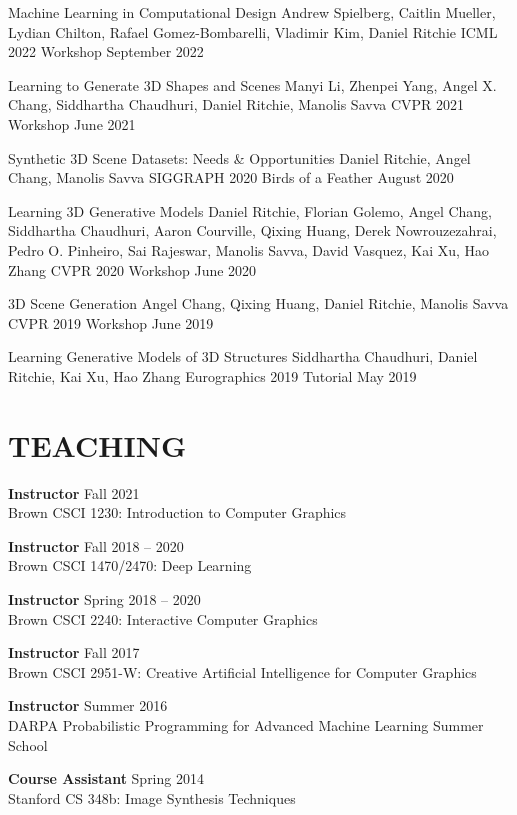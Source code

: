 \documentclass[line,margin]{res}
\begin{document}
\begin{resume}
\workshop
{Machine Learning in Computational Design}
{Andrew Spielberg, Caitlin Mueller, Lydian Chilton, Rafael Gomez-Bombarelli, Vladimir Kim, Daniel Ritchie}
{ICML 2022 Workshop}
{September 2022}

\workshop
{Learning to Generate 3D Shapes and Scenes}
{Manyi Li, Zhenpei Yang, Angel X. Chang, Siddhartha Chaudhuri, Daniel Ritchie, Manolis Savva}
{CVPR 2021 Workshop}
{June 2021}

\workshop
{Synthetic 3D Scene Datasets: Needs \& Opportunities}
{Daniel Ritchie, Angel Chang, Manolis Savva}
{SIGGRAPH 2020 Birds of a Feather}
{August 2020}

\workshop
{Learning 3D Generative Models}
{Daniel Ritchie, Florian Golemo, Angel Chang, Siddhartha Chaudhuri, Aaron Courville, Qixing Huang, Derek Nowrouzezahrai, Pedro O. Pinheiro, Sai Rajeswar, Manolis Savva, David Vasquez, Kai Xu, Hao Zhang}
{CVPR 2020 Workshop}
{June 2020}

\workshop
{3D Scene Generation}
{Angel Chang, Qixing Huang, Daniel Ritchie, Manolis Savva}
{CVPR 2019 Workshop}
{June 2019}

\tutorial
{Learning Generative Models of 3D Structures}
{Siddhartha Chaudhuri, Daniel Ritchie, Kai Xu, Hao Zhang}
{Eurographics 2019 Tutorial}
{May 2019}


\section{TEACHING}

\newcommand{\teach}[3] {
	\textbf{#1} \hfill #3\\
	#2
}

\teach
{Instructor}
{Brown CSCI 1230: Introduction to Computer Graphics}
{Fall 2021}

\teach
{Instructor}
{Brown CSCI 1470/2470: Deep Learning}
{Fall 2018 -- 2020}

\teach
{Instructor}
{Brown CSCI 2240: Interactive Computer Graphics}
{Spring 2018 -- 2020}

\teach
{Instructor}
{Brown CSCI 2951-W: Creative Artificial Intelligence for Computer Graphics}
{Fall 2017}

\teach
{Instructor}
{DARPA Probabilistic Programming for Advanced Machine Learning Summer School}
{Summer 2016}

\teach
{Course Assistant}
{Stanford CS 348b: Image Synthesis Techniques}
{Spring 2014}


\end{resume}
\end{document}

